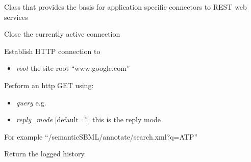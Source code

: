 \documentclass[a4paper,11pt,english]{sphinxmanual}
\begin{document}
\begin{fulllineitems}
\label{modules_doc:cbmpy.CBNetDB.RESTClient}
Class that provides the basis for application specific connectors to REST web services

\begin{fulllineitems}
\label{modules_doc:cbmpy.CBNetDB.RESTClient.Close}
Close the currently active connection

\end{fulllineitems}


\begin{fulllineitems}
\label{modules_doc:cbmpy.CBNetDB.RESTClient.Connect}
Establish HTTP connection to
\begin{itemize}
\item {} 
\emph{root} the site root ``www.google.com''

\end{itemize}

\end{fulllineitems}


\begin{fulllineitems}
\label{modules_doc:cbmpy.CBNetDB.RESTClient.Get}
Perform an http GET using:
\begin{itemize}
\item {} 
\emph{query} e.g.

\item {} 
\emph{reply\_mode} {[}default='`{]} this is the reply mode

\end{itemize}

For example ``/semanticSBML/annotate/search.xml?q=ATP''

\end{fulllineitems}


\begin{fulllineitems}
\label{modules_doc:cbmpy.CBNetDB.RESTClient.GetLog}
Return the logged history


\end{fulllineitems}
\end{fulllineitems}
\end{document}
